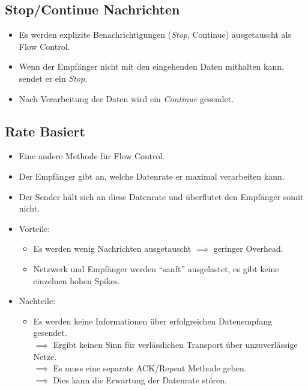         \subsection{Stop/Continue Nachrichten}
	        \begin{itemize}
	        	\item Es werden explizite Benachrichtigungen (\textit{Stop}, Continue) ausgetauscht als Flow Control.
	        	\item Wenn der Empfänger nicht mit den eingehenden Daten mithalten kann, sendet er ein \textit{Stop}.
	        	\item Nach Verarbeitung der Daten wird ein \textit{Continue} gesendet.
	        \end{itemize}

        \subsection{Rate Basiert}
            \begin{itemize}
            	\item Eine andere Methode für Flow Control.
            	\item Der Empfänger gibt an, welche Datenrate er maximal verarbeiten kann.
            	\item Der Sender hält sich an diese Datenrate und überflutet den Empfänger somit nicht.
            	\item Vorteile:
                	\begin{itemize}
                		\item Es werden wenig Nachrichten ausgetauscht \(\implies\) geringer Overhead.
                		\item Netzwerk und Empfänger werden \enquote{sanft} ausgelastet, es gibt keine einzelnen hohen Spikes.
                	\end{itemize}
                \item Nachteile:
	                \begin{itemize}
	                	\item Es werden keine Informationen über erfolgreichen Datenempfang gesendet. \\ \(\implies\) Ergibt keinen Sinn für verlässlichen Transport über unzuverlässige Netze. \\ \(\implies\) Es muss eine separate ACK/Repeat Methode geben. \\ \(\implies\) Dies kann die Erwartung der Datenrate stören.
	                \end{itemize}
            \end{itemize}

